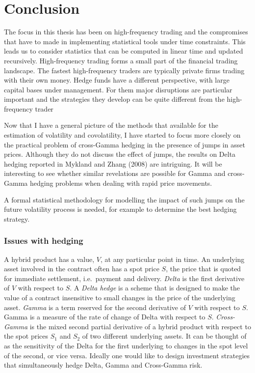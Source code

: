 \chapter{Conclusion}
The focus in this thesis has been on high-frequency trading and the compromises that have to made in implementing statistical tools under time constraints.  This leads us to consider statistics that can be computed in linear time and updated recursively. High-frequency trading forms a small part of the financial trading landscape. The fastest high-frequency traders are typically private firms trading with their own money.  Hedge funds have a different perspective, with large capital bases under management. For them major disruptions are particular important and the strategies they develop can be quite different from the high-frequency trader      

    
Now that I have a general picture of the methods that available for the estimation of volatility and covolatility, I have started to focus more closely on the practical problem of cross-Gamma hedging in the presence of jumps in asset prices.  Although they do not discuss the effect of jumps, the results on Delta hedging reported in Mykland and Zhang (2008) are intriguing. It will be interesting to see whether similar revelations are possible for Gamma and cross-Gamma hedging problems when dealing with rapid price movements. 

A formal statistical methodology for modelling the impact of such jumps on the future volatility process is needed, for example to determine the best hedging strategy.    

\subsection*{Issues with hedging}\label{hedging}
A hybrid product has a value, $V$, at any particular point in time. An underlying asset involved in the contract often has a spot price $S$, 
the price that is quoted for immediate settlement, i.e.\ payment and delivery. \textit{Delta} is the first derivative of $V$ with respect to $S$. 
A \textit{Delta hedge} is a scheme that is designed to make the value of a contract insensitive to small changes in the price of the underlying asset.
 \textit{Gamma} is a term reserved for the second derivative of $V$ with respect to $S$. Gamma is a measure of the rate of change of Delta with respect 
to $S$. \textit{Cross-Gamma} is the mixed second partial derivative of a hybrid product with respect to the spot prices $S_1$ and $S_2$ of two 
different underlying assets. It can be thought of as the sensitivity of the Delta for the first underlying to changes in the spot level of the 
second, or vice versa. Ideally one would like to design investment strategies that simultaneously hedge Delta, Gamma and Cross-Gamma risk.

